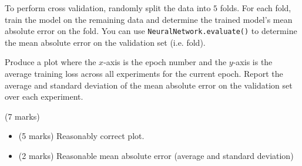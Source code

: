 \documentclass[12pt]{article}
\begin{document}
\begin{enumerate}[font=\Large,label=(\alph*)]
To perform cross validation, randomly split the data into $5$ folds. For each fold, train the model on the remaining data and determine the trained model's mean absolute error on the fold. You can use \texttt{NeuralNetwork.evaluate()} to determine the mean absolute error on the validation set (i.e. fold). 

Produce a plot where the $x$-axis is the epoch number and the $y$-axis is the average training loss across all experiments for the current epoch. Report the average and standard deviation of the mean absolute error on the validation set over each experiment.

\begin{markscheme}
(7 marks)

\begin{itemize}
    \item (5 marks) Reasonably correct plot.
    \item (2 marks) Reasonable mean absolute error (average and standard deviation)
\end{itemize}

\end{markscheme}



\end{enumerate}
\end{document}
